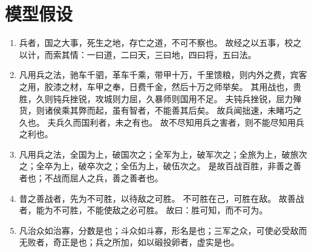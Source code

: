 \section{模型假设}

\begin{enumerate}
    \item 兵者，国之大事，死生之地，存亡之道，不可不察也。
    故经之以五事，校之以计，而索其情：一曰道，二曰天，三曰地，四曰将，五曰法。
    \item 凡用兵之法，驰车千驷，革车千乘，带甲十万，千里馈粮，则内外之费，宾客之用，胶漆之材，车甲之奉，日费千金，然后十万之师举矣。
    其用战也，贵胜，久则钝兵挫锐，攻城则力屈，久暴师则国用不足。
    夫钝兵挫锐，屈力殚货，则诸侯乘其弊而起，虽有智者，不能善其后矣。
    故兵闻拙速，未睹巧之久也。
    夫兵久而国利者，未之有也。
    故不尽知用兵之害者，则不能尽知用兵之利也。
    \item 凡用兵之法，全国为上，破国次之；全军为上，破军次之；全旅为上，破旅次之；全卒为上，破卒次之；全伍为上，破伍次之。
    是故百战百胜，非善之善者也；不战而屈人之兵，善之善者也。
    \item 昔之善战者，先为不可胜，以待敌之可胜。
    不可胜在己，可胜在敌。
    故善战者，能为不可胜，不能使敌之必可胜。
    故曰：胜可知，而不可为。 
    \item 凡治众如治寡，分数是也；斗众如斗寡，形名是也；三军之众，可使必受敌而无败者，奇正是也；兵之所加，如以碫投卵者，虚实是也。 

\end{enumerate}